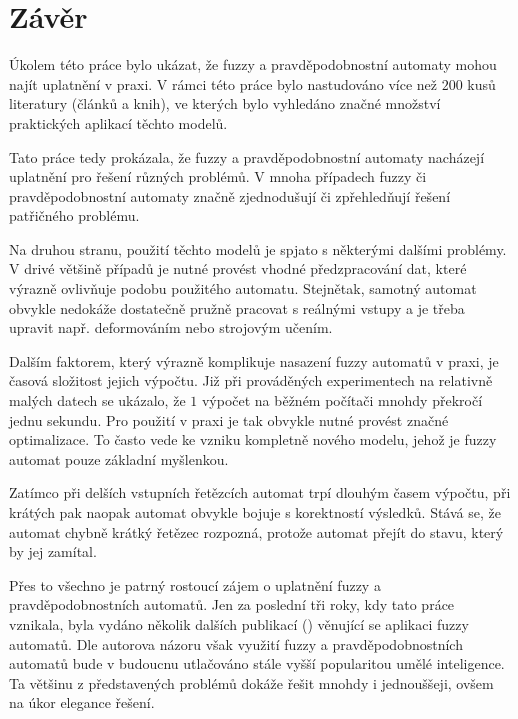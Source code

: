 
\section{Závěr}
Úkolem této práce bylo ukázat, že fuzzy a pravděpodobnostní automaty mohou najít uplatnění v praxi. V rámci této práce bylo nastudováno více než $200$ kusů literatury (článků a knih), ve kterých bylo vyhledáno značné množství praktických aplikací těchto modelů.

Tato práce tedy prokázala, že fuzzy a pravděpodobnostní automaty nacházejí uplatnění pro řešení různých problémů. V mnoha případech fuzzy či pravděpodobnostní automaty značně zjednodušují či zpřehledňují řešení patřičného problému.

Na druhou stranu, použití těchto modelů je spjato s některými dalšími problémy. V drivé většině případů je nutné provést vhodné předzpracování dat, které výrazně ovlivňuje podobu použitého automatu. Stejnětak, samotný automat obvykle nedokáže dostatečně pružně pracovat s reálnými vstupy a je třeba upravit např. deformováním nebo strojovým učením.

Dalším faktorem, který výrazně komplikuje nasazení fuzzy automatů v praxi, je časová složitost jejich výpočtu. Již při prováděných experimentech na relativně malých datech se ukázalo, že $1$ výpočet na běžném počítači mnohdy překročí jednu sekundu. Pro použití v praxi je tak obvykle nutné provést značné optimalizace. To často vede ke vzniku kompletně nového modelu, jehož je fuzzy automat pouze základní myšlenkou.

Zatímco při delších vstupních řetězcích automat trpí dlouhým časem výpočtu, při krátých pak naopak automat obvykle bojuje s korektností výsledků. Stává se, že automat chybně krátký řetězec rozpozná, protože automat  přejít do stavu, který by jej zamítal.

Přes to všechno je patrný rostoucí zájem o uplatnění fuzzy a pravděpodobnostních automatů. Jen za poslední tři roky, kdy tato práce vznikala, byla vydáno několik dalších publikací (\cite{MukRay-StaSplMerProbFiStaAuSigRepAna, ManPra-PriPatDetUsFiStMaFuzTra, Jia+-ExHeaSimMetBasIntHumTheMod, GupRah-CliMonUsFuzSys, CamMerNun-UsFuzAutDiagPrHeaPro}) věnující se aplikaci fuzzy automatů. Dle autorova názoru však využití fuzzy a pravděpodobnostních automatů bude v budoucnu utlačováno stále vyšší popularitou umělé inteligence. Ta většinu z představených problémů dokáže řešit mnohdy i jednouššeji, ovšem na úkor elegance řešení.

